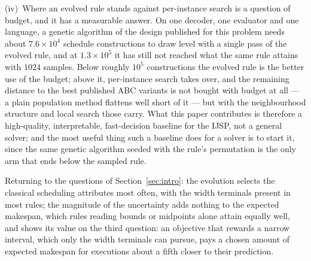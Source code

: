 \documentclass[review,authoryear,11pt]{elsarticle}
\newcommand{\rev}[1]{\textcolor{revcolor}{#1}}
\begin{document}
\rev{(iv)~Where an evolved rule stands against per-instance search is a
question of budget, and it has a measurable answer. On one decoder, one
evaluator and one language, a genetic algorithm of the design published
for this problem needs about $7.6\times10^{4}$ schedule constructions to
draw level with a single pass of the evolved rule, and at
$1.3\times10^{5}$ it has still not reached what the same rule attains
with $1024$ samples. Below roughly $10^{5}$ constructions the evolved
rule is the better use of the budget; above it, per-instance search
takes over, and the remaining distance to the best published ABC
variants is not bought with budget at all --- a plain population method
flattens well short of it --- but with the neighbourhood structure and
local search those carry. What this paper contributes is therefore a
high-quality, interpretable, fast-decision baseline for the IJSP, not a
general solver; and the most useful thing such a baseline does for a
solver is to start it, since the same genetic algorithm seeded with the
rule's permutation is the only arm that ends below the sampled rule.}

Returning to the questions of Section~\ref{sec:intro}: the evolution
selects the classical scheduling attributes most often, with the width
terminals present in most rules; the magnitude of the uncertainty adds
nothing to the expected makespan, which rules reading bounds or
midpoints alone attain equally well, and shows its value on the third
question: an objective that rewards a narrow interval, which only the
width terminals can pursue, pays a chosen amount of expected makespan
for executions about a fifth closer to their prediction.
\end{document}
